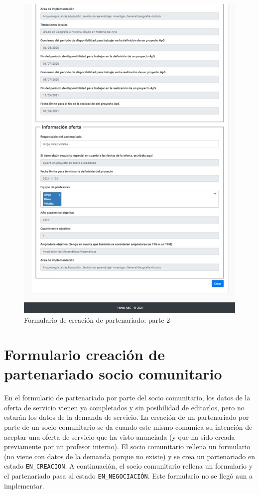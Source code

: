 \documentclass[11pt]{book}
\begin{document}
	\begin{figure}[t]
		\centering
		\includegraphics[scale=0.9]{partenariado2}
		\caption{Formulario de creación de partenariado: parte 2}
	\end{figure}
	\section{Formulario creación de partenariado socio comunitario}
	En el formulario de partenariado por parte del socio comunitario, los datos de la oferta de servicio vienen ya completados y sin posibilidad de editarlos, pero no estarán los datos de la demanda de servicio. La creación de un partenariado por parte de un socio comunitario se da cuando este mismo comunica su intención de aceptar una oferta de servicio que ha visto anunciada (y que ha sido creada previamente por un profesor interno). El socio comunitario rellena un formulario (no viene con datos de la demanda porque no existe) y se crea un partenariado en estado \texttt{EN\_CREACION}. A continuación, el socio comunitario rellena un formulario y el partenariado pasa al estado \texttt{EN\_NEGOCIACIÓN}. Este formulario no se llegó aun a implementar.
		
\end{document}
